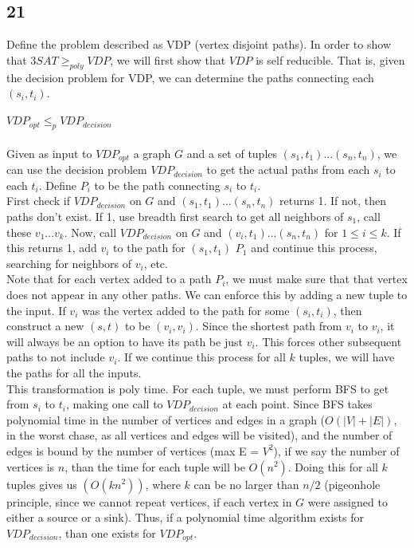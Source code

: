 \documentclass[letterpaper,notitlepage,twoside]{article}
\begin{document}
\subsection*{21}
Define the problem described as VDP (vertex disjoint paths). In order to show that $3SAT \geq _{poly} VDP$, we will first show that $VDP$ is self reducible. That is, given the decision problem for VDP, we can determine the paths connecting each $(s_i, t_i)$. \\\\
$VDP_{opt} \leq _{p} VDP_{decision}$\\\\
Given as input to $VDP_{opt}$ a graph $G$ and a set of tuples $(s_1, t_1) ... (s_n, t_n)$, we can use the decision problem $VDP_{decision}$ to get the actual paths from each $s_i$ to each $t_i$. Define $P_i$ to be the path connecting $s_i$ to $t_i$. \\
First check if $VDP_{decision}$ on $G$ and $(s_1, t_1) ... (s_n, t_n)$ returns 1. If not, then paths don't exist. If 1, use breadth first search to get all neighbors of $s_1$, call these $v_1...v_k$. Now, call $VDP_{decision}$ on $G$ and $(v_i, t_1) ... (s_n, t_n)$ for $1\leq i \leq k$. If this returns 1, add $v_i$ to the path for $(s_1, t_1)$ $P_1$ and continue this process, searching for neighbors of $v_i$, etc. \\
Note that for each vertex added to a path $P_i$, we must make sure that that vertex does not appear in any other paths. We can enforce this by adding a new tuple to the input. If $v_i$ was the vertex added to the path for some $(s_i, t_i)$, then construct a new $(s, t)$ to be $(v_i, v_i)$. Since the shortest path from $v_i$ to $v_i$, it will always be an option to have its path be just $v_i$. This forces other subsequent paths to not include $v_i$. If we continue this process for all $k$ tuples, we will have the paths for all the inputs. \\
This transformation is poly time. For each tuple, we must perform BFS to get from $s_i$ to $t_i$, making one call to $VDP_{decision}$ at each point. Since BFS takes polynomial time in the number of vertices and edges in a graph ($O(|V| + |E|)$, in the worst chase, as all vertices and edges will be visited), and the number of edges is bound by the number of vertices (max E = $V^2$), if we say the number of vertices is $n$, than the time for each tuple will be $O(n^2)$. Doing this for all $k$ tuples gives us $(O(kn^2))$, where $k$ can be no larger than $n/2$ (pigeonhole principle, since we cannot repeat vertices, if each vertex in $G$ were assigned to either a source or a sink). Thus, if a polynomial time algorithm exists for $VDP_{decision}$, than one exists for $VDP_{opt}$. \\\\
\end{document}
